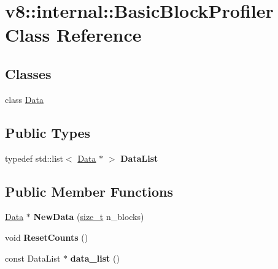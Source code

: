 \hypertarget{classv8_1_1internal_1_1BasicBlockProfiler}{}\section{v8\+:\+:internal\+:\+:Basic\+Block\+Profiler Class Reference}
\label{classv8_1_1internal_1_1BasicBlockProfiler}
\subsection*{Classes}
\begin{DoxyCompactItemize}
\item 
class \mbox{\hyperlink{classv8_1_1internal_1_1BasicBlockProfiler_1_1Data}{Data}}
\end{DoxyCompactItemize}
\subsection*{Public Types}
\begin{DoxyCompactItemize}
\item 
\mbox{\label{classv8_1_1internal_1_1BasicBlockProfiler_a7f5f96a6ba2122badb89714b849be9c7}} 
typedef std\+::list$<$ \mbox{\hyperlink{classv8_1_1internal_1_1BasicBlockProfiler_1_1Data}{Data}} $\ast$ $>$ {\bfseries Data\+List}
\end{DoxyCompactItemize}
\subsection*{Public Member Functions}
\begin{DoxyCompactItemize}
\item 
\mbox{\label{classv8_1_1internal_1_1BasicBlockProfiler_a538de5904fafeabe2ec71ad9a75e62ba}} 
\mbox{\hyperlink{classv8_1_1internal_1_1BasicBlockProfiler_1_1Data}{Data}} $\ast$ {\bfseries New\+Data} (\mbox{\hyperlink{classsize__t}{size\+\_\+t}} n\+\_\+blocks)
\item 
\mbox{\label{classv8_1_1internal_1_1BasicBlockProfiler_a0b1489c4a45d1f51e7bc38b74eb1c974}} 
void {\bfseries Reset\+Counts} ()
\item 
\mbox{\label{classv8_1_1internal_1_1BasicBlockProfiler_a2dfa3d982dfbaba87e278816f66e06bf}} 
const Data\+List $\ast$ {\bfseries data\+\_\+list} ()
\end{DoxyCompactItemize}
